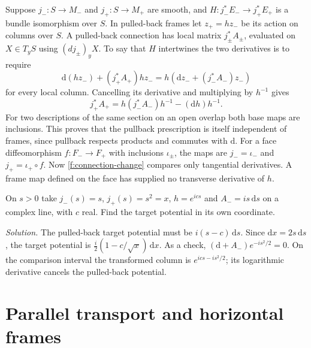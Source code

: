 Suppose $j_-:S\to M_-$ and $j_+:S\to M_+$ are smooth, and $H:j_-^*E_-\to j_+^*E_+$ is a bundle isomorphism over $S$. In pulled-back frames let $z_+=h z_-$ be its action on columns over $S$. A pulled-back connection has local matrix $j_\pm^* A_\pm$, evaluated on $X\in T_yS$ using $(dj_\pm)_y X$. To say that $H$ intertwines the two derivatives is to require
\[
 \mathrm d(h z_-)+(j_+^*A_+)h z_-=h(\mathrm dz_-+(j_-^*A_-)z_-)
\]
for every local column. Cancelling its derivative and multiplying by $h^{-1}$ gives
\begin{equation}
 j_+^*A_+=h(j_-^*A_-)h^{-1}-(\mathrm dh)h^{-1}.\label{f:connection-change}
\end{equation}
For two descriptions of the same section on an open overlap both base maps are inclusions. This proves that the pullback prescription is itself independent of frames, since pullback respects products and commutes with $\mathrm d$. For a face diffeomorphism $f:F_-\to F_+$ with inclusions $\iota_\pm$, the maps are $j_-=\iota_-$ and $j_+=\iota_+\circ f$. Now \eqref{f:connection-change} compares only tangential derivatives. A frame map defined on the face has supplied no transverse derivative of $h$.

\begin{exercise}
On $s>0$ take $j_-(s)=s$, $j_+(s)=s^2=x$, $h=e^{ics}$ and $A_-=i s\,\mathrm ds$ on a complex line, with $c$ real. Find the target potential in its own coordinate.

\emph{Solution.} The pulled-back target potential must be $i(s-c)\,\mathrm ds$. Since $\mathrm dx=2s\,\mathrm ds$, the target potential is $\tfrac i2(1-c/\sqrt{x})\,\mathrm dx$. As a check, $(\mathrm d+A_-)e^{-is^2/2}=0$. On the comparison interval the transformed column is $e^{ics-is^2/2}$; its logarithmic derivative cancels the pulled-back potential.
\end{exercise}

\section{Parallel transport and horizontal frames}

